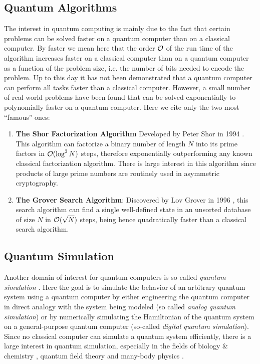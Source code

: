 \subsection{Quantum Algorithms}

The interest in quantum computing is mainly due to the fact that certain problems can be solved faster on a quantum computer than on a classical computer. By faster we mean here that the order $\cal{O}$ of the run time of the algorithm increases faster on a classical computer than on a quantum computer as a function of the problem size, i.e. the number of bits needed to encode the problem. Up to this day it has not been demonstrated that a quantum computer can perform all tasks faster than a classical computer. However, a small number of real-world problems have been found that can be solved exponentially to polynomially faster on a quantum computer. Here we cite only the two most ``famous'' ones:

\begin{enumerate}
\item \textbf{The Shor Factorization Algorithm} Developed by Peter Shor in 1994 \citep{shor_algorithms_1994,shor_polynomial-time_1995}. This algorithm can factorize a binary number of length $N$ into its prime factors in $\begin{mathcal}O\end{mathcal}(\log^3{N})$ steps, therefore exponentially outperforming any known classical factorization algorithm. There is large interest in this algorithm since products of large prime numbers are routinely used in asymmetric cryptography.
\item \textbf{The Grover Search Algorithm}: Discovered by Lov Grover in 1996 \citep{grover_fast_1996}, this search algorithm can find a single well-defined state in an unsorted database of size $N$ in $\begin{mathcal}O\end{mathcal}(\sqrt{N})$ steps, being hence quadratically faster than a classical search algorithm.
\end{enumerate}

\subsection{Quantum Simulation}

Another domain of interest for quantum computers is so called {\it quantum simulation} \citep{lloyd_universal_1996}. Here the goal is to simulate the behavior of an arbitrary quantum system using a quantum computer by either engineering the quantum computer in direct analogy with the system being modeled (so called {\it analog quantum simulation}) or by numerically simulating the Hamiltonian of the quantum system on a general-purpose quantum computer (so-called {\it digital quantum simulation}). Since no classical computer can simulate a quantum system efficiently, there is a large interest in quantum simulation, especially in the fields of biology \& chemistry \citep{barreiro_open-system_2011}, quantum field theory \citep{gerritsma_quantum_2010,freedman_simulation_2002} and many-body physics \citep{simon_quantum_2011}.

